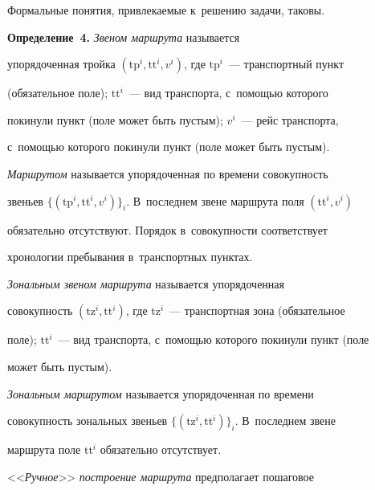 Формальные понятия, привлекаемые к~решению задачи, таковы.





\smallskip





\textbf{Определение~4.} \textit{Звеном маршрута} называется 


упорядоченная тройка $(\mathrm{tp}^i, \mathrm{tt}^i, v^i)$, где $\mathrm{tp}^i$~--- транспортный пункт 


(обязательное поле); $\mathrm{tt}^i$~--- вид транспорта, с~по\-мощью которого 


покинули пункт (поле может быть пус\-тым); $v^i$~--- рейс транспорта, 


с~по\-мощью которого покинули пункт (поле может быть пус\-тым).





\textit{Маршрутом} называется упорядоченная по времени со\-во\-куп\-ность 


звеньев $\{(\mathrm{tp}^i, \mathrm{tt}^i, v^i)\}_i$. В~последнем звене маршрута поля $(\mathrm{tt}^i, v^i)$ 


обязательно отсутствуют. Порядок в~со\-во\-куп\-ности соответствует 


хронологии пребывания в~транспортных пунктах.





\textit{Зональным звеном маршрута} называется упорядоченная 


совокупность $(\mathrm{tz}^i, \mathrm{tt}^i)$, где $\mathrm{tz}^i$~--- транспортная зона (обязательное 


поле); $\mathrm{tt}^i$~--- вид транспорта, с~по\-мощью которого покинули пункт (поле 


может быть пус\-тым).





\textit{Зональным маршрутом} называется упорядоченная по времени 


со\-во\-куп\-ность зональных звеньев $\{(\mathrm{tz}^i, \mathrm{tt}^i)\}_i$. В~последнем звене 


маршрута поле $\mathrm{tt}^i$ обязательно отсутствует.





<<\textit{Ручное}>> \textit{построение маршрута} предполагает пошаговое 


